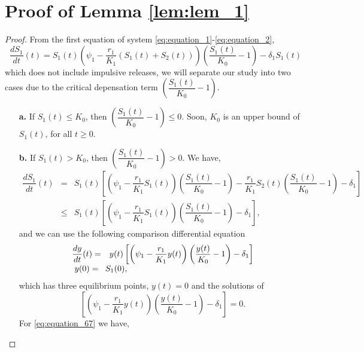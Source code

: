 \documentclass[10pt,letterpaper]{article}
\begin{document}
\section{Proof of Lemma \eqref{lem:lem_1}} 
\label{appendix:B}
\begin{proof}
    From the first equation of system \eqref{eq:equation_1}-\eqref{eq:equation_2},
\begin{equation}\label{eq:equation_64}
    \dfrac{dS_1}{dt}(t) = S_1(t)\left(\psi_1-\dfrac{r_1}{K_1}(S_1(t)+S_2(t))\right) \left(\dfrac{S_1(t)}{K_0} - 1 \right) - \delta_1 S_1(t)
\end{equation}which does not include impulsive releases, we will separate our study into two cases due to the critical depensation term $\left(\dfrac{S_1(t)}{K_0} - 1 \right)$.
\begin{itemize}
    \item[\textbf{a.}] If $S_1(t)\leq K_0$, then $\left(\dfrac{S_1(t)}{K_0} - 1 \right)\leq 0.$ Soon, $K_0$ is an upper bound of $S_1(t)$, for all $t\geq0$.
    \item[\textbf{b.}] If $S_1(t)>K_0$, then $\left(\dfrac{S_1(t)}{K_0} - 1 \right)>0.$ We have,
\begin{eqnarray}\label{eq:equation_65}\nonumber
   \dfrac{dS_1}{dt}(t) &=& S_1(t)\left[\left(\psi_1 -\dfrac{r_1}{K_1}S_1(t)\right)\left(\dfrac{S_1(t)}{K_0} - 1 \right)-\dfrac{r_1}{K_1}S_2(t)\left(\dfrac{S_1(t)}{K_0} - 1 \right)-\delta_1\right]\\
   &\leq&S_1(t)\left[\left(\psi_1 -\dfrac{r_1}{K_1}S_1(t)\right)\left(\dfrac{S_1(t)}{K_0} - 1 \right)-\delta_1\right],
\end{eqnarray}and we can use the following comparison differential equation
\begin{align}
\begin{matrix}\label{eq:equation_66}
\dfrac{dy}{dt}(t)=& y(t)\left[\left(\psi_1 -\dfrac{r_1}{K_1}y(t)\right)\left(\dfrac{y(t)}{K_0} - 1 \right)-\delta_1\right]\\
y(0)=&\hspace{-5.5cm}S_1(0),
\end{matrix}
\end{align}which has three equilibrium points, $y(t) = 0$ and the solutions of \begin{equation}\label{eq:equation_67}
    \left[\left(\psi_1 -\dfrac{r_1}{K_1}y(t)\right)\left(\dfrac{y(t)}{K_0} - 1 \right)-\delta_1\right] = 0.
\end{equation}
For \eqref{eq:equation_67} we have,
\begin{equation}\label{eq:equation_68}

\end{equation}
\end{itemize}
\end{proof}
\end{document}

